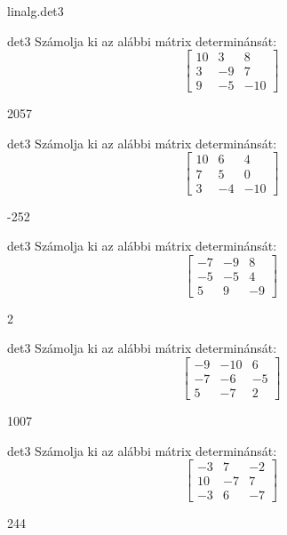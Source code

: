 \documentclass[12pt]{article}
\begin{document}
\begin{quiz}{linalg.det3}
\begin{numerical}{det3}
Számolja ki az alábbi mátrix determinánsát:
$$\left[\begin{array}{ccc}10& 3& 8\\ 3& -9& 7\\ 9& -5& -10\end{array}\right]$$

\item 2057
\end{numerical}


\begin{numerical}{det3}
Számolja ki az alábbi mátrix determinánsát:
$$\left[\begin{array}{ccc}10& 6& 4\\ 7& 5& 0\\ 3& -4& -10\end{array}\right]$$

\item -252
\end{numerical}


\begin{numerical}{det3}
Számolja ki az alábbi mátrix determinánsát:
$$\left[\begin{array}{ccc}-7& -9& 8\\ -5& -5& 4\\ 5& 9& -9\end{array}\right]$$

\item 2
\end{numerical}


\begin{numerical}{det3}
Számolja ki az alábbi mátrix determinánsát:
$$\left[\begin{array}{ccc}-9& -10& 6\\ -7& -6& -5\\ 5& -7& 2\end{array}\right]$$

\item 1007
\end{numerical}


\begin{numerical}{det3}
Számolja ki az alábbi mátrix determinánsát:
$$\left[\begin{array}{ccc}-3& 7& -2\\ 10& -7& 7\\ -3& 6& -7\end{array}\right]$$

\item 244
\end{numerical}



\end{quiz}
\end{document}
